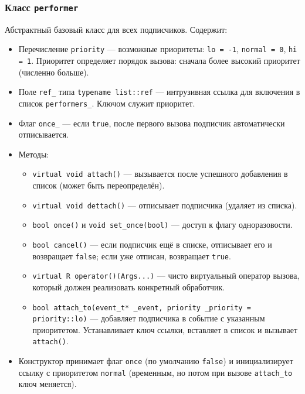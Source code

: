 \documentclass[a4paper,12pt]{article}
\begin{document}
\subsubsection{Класс \texttt{performer}}

Абстрактный базовый класс для всех подписчиков. Содержит:

\begin{itemize}
    \item Перечисление \texttt{priority} — возможные приоритеты: \texttt{lo = -1}, \texttt{normal = 0}, \texttt{hi = 1}. Приоритет определяет порядок вызова: сначала более высокий приоритет (численно больше).
    \item Поле \texttt{ref\_} типа \texttt{typename list::ref} — интрузивная ссылка для включения в список \texttt{performers\_}. Ключом служит приоритет.
    \item Флаг \texttt{once\_} — если \texttt{true}, после первого вызова подписчик автоматически отписывается.
    \item Методы:
        \begin{itemize}
            \item \texttt{virtual void attach()} — вызывается после успешного добавления в список (может быть переопределён).
            \item \texttt{virtual void dettach()} — отписывает подписчика (удаляет из списка).
            \item \texttt{bool once()} и \texttt{void set\_once(bool)} — доступ к флагу одноразовости.
            \item \texttt{bool cancel()} — если подписчик ещё в списке, отписывает его и возвращает \texttt{false}; если уже отписан, возвращает \texttt{true}.
            \item \texttt{virtual R operator()(Args...)} — чисто виртуальный оператор вызова, который должен реализовать конкретный обработчик.
            \item \texttt{bool attach\_to(event\_t* \_event, priority \_priority = priority::lo)} — добавляет подписчика в событие с указанным приоритетом. Устанавливает ключ ссылки, вставляет в список и вызывает \texttt{attach()}.
        \end{itemize}
    \item Конструктор принимает флаг \texttt{once} (по умолчанию \texttt{false}) и инициализирует ссылку с приоритетом \texttt{normal} (временным, но потом при вызове \texttt{attach\_to} ключ меняется).
\end{itemize}
\end{document}
